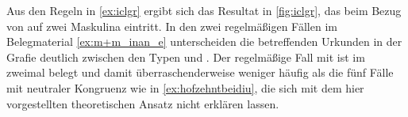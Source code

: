 











Aus den Regeln in \cref{ex:iclgr} ergibt sich das Resultat in \cref{fig:iclgr},
das beim Bezug von  auf zwei Maskulina eintritt. In den zwei
regelmäßigen Fällen im Belegmaterial \cref{ex:m+m_inan_e} unterscheiden die
betreffenden Urkunden in der Grafie deutlich zwischen den Typen  und
. Der regelmäßige Fall mit  ist im  zweimal
belegt und damit über\-raschender\-weise weniger häufig als die fünf Fälle mit
neutraler Kongruenz wie in \cref{ex:hofzehntbeidiu}, die sich mit dem hier
vorgestellten theoretischen Ansatz nicht erklären lassen.

